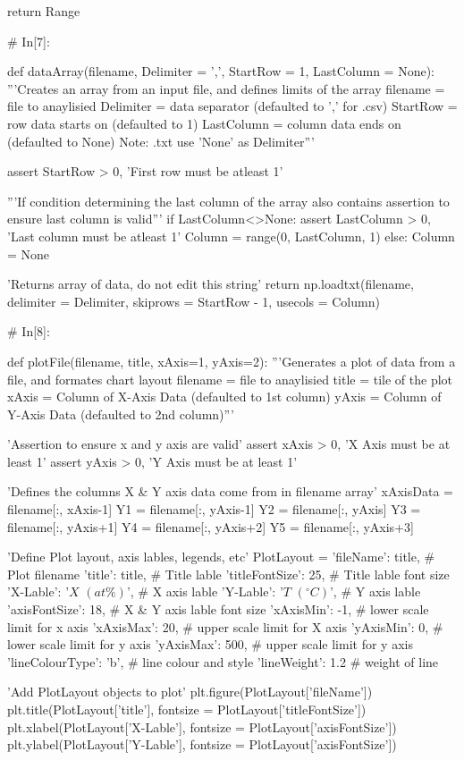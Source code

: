 \documentclass[a4paper,8pt]{article}
\begin{document}
\begin{python}
return Range


# In[7]:

def dataArray(filename, Delimiter = ',', StartRow = 1, LastColumn = None):
'''Creates an array from an input file, and defines limits of the array
filename = file to anaylisied
Delimiter = data separator (defaulted to ',' for .csv)
StartRow = row data starts on (defaulted to 1)
LastColumn = column data ends on (defaulted to None)
Note: .txt use 'None' as Delimiter'''

assert StartRow > 0, 'First row must be atleast 1'

'''If condition determining the last column of the array
also contains assertion to ensure last column is valid'''
if LastColumn<>None:
assert LastColumn > 0, 'Last column must be atleast 1'
Column = range(0, LastColumn, 1)
else:
Column = None

'Returns array of data, do not edit this string'
return np.loadtxt(filename, delimiter = Delimiter,
skiprows = StartRow - 1, 
usecols = Column)


# In[8]:

def plotFile(filename, title, xAxis=1, yAxis=2):
'''Generates a plot of data from a file, and formates chart layout
filename = file to anaylisied
title = tile of the plot
xAxis = Column of X-Axis Data (defaulted to 1st column)
yAxis = Column of Y-Axis Data (defaulted to 2nd column)'''

'Assertion to ensure x and y axis are valid'
assert xAxis > 0, 'X Axis must be at least 1'
assert yAxis > 0, 'Y Axis must be at least 1'

'Defines the columns X & Y axis data come from in filename array'
xAxisData = filename[:, xAxis-1]
Y1 = filename[:, yAxis-1]
Y2 = filename[:, yAxis]
Y3 = filename[:, yAxis+1]
Y4 = filename[:, yAxis+2]
Y5 = filename[:, yAxis+3]

'Define Plot layout, axis lables, legends, etc'
PlotLayout = {'fileName': title, # Plot filename 
	'title': title, # Title lable
	'titleFontSize': 25, # Title lable font size
	'X-Lable': '$X$ $(at\%)$', # X axis lable
	'Y-Lable': '$T$  $(^{\circ}C)$', # Y axis lable
	'axisFontSize': 18, # X & Y axis lable font size
	'xAxisMin': -1, # lower scale limit for x axis
	'xAxisMax': 20, # upper scale limit for X axis
	'yAxisMin': 0, # lower scale limit for y axis
	'yAxisMax': 500, # upper scale limit for y axis
	'lineColourType': 'b', # line colour and style
	'lineWeight': 1.2 # weight of line
}

'Add PlotLayout objects to plot'
plt.figure(PlotLayout['fileName'])
plt.title(PlotLayout['title'], fontsize = PlotLayout['titleFontSize'])
plt.xlabel(PlotLayout['X-Lable'], fontsize = PlotLayout['axisFontSize'])
plt.ylabel(PlotLayout['Y-Lable'], fontsize = PlotLayout['axisFontSize'])


\end{python}
\end{document}
